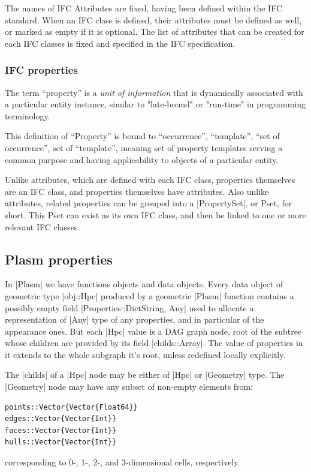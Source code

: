 \begin{coding}
The names of IFC Attributes are fixed, having been defined within the IFC standard. When an IFC class is defined, their attributes must be defined as well, or marked as empty if it is optional. The list of attributes that can be created for each IFC classes is fixed and specified in the IFC specification. 


\subsubsection*{IFC properties}\label{sect:4-4-2-2}

\begin{definition}
The term “property” is a \emph{unit of information} that is dynamically associated with a particular entity instance, similar to "late-bound" or "run-time" in programming terminology. 
\end{definition}

This definition of “Property” is bound to “occurrence”, “template”, “set of occurrence”, set of “template”, meaning set of property templates serving a common purpose and having applicability to objects of a particular entity.

Unlike attributes, which are defined with each IFC class, properties themselves are an IFC class, and properties themselves have attributes. Also unlike attributes, related properties can be grouped into a |PropertySet|, or Pset, for short. This Pset can exist as its own IFC class, and then be linked to one or more relevant IFC classes. 


\subsection*{Plasm properties}\label{sect:4-4-3}

In |Plasm| we have functions objects and data objects. Every data object of geometric type |obj::Hpc| produced by a geometric |Plasm| function contains a possibly empty field |Properties::Dict{String, Any}| used to allocate a representation of |Any| type of any properties, and in particular of the appearance ones. But each |Hpc| value is a DAG graph node, root of the subtree whose children are provided by its field |childs::Array|. The value of properties in it extends to the whole subgraph it’s root, unless redefined locally explicitly.

The |childs| of a |Hpc| node may be either of |Hpc| or |Geometry| type. The |Geometry| node may have any subset of non-empty elements from:
\begin{lstlisting}[language=JuliaLocal, style=julia, mathescape=true]
points::Vector{Vector{Float64}}
edges::Vector{Vector{Int}}
faces::Vector{Vector{Int}}
hulls::Vector{Vector{Int}}
\end{lstlisting}
corresponding to 0-, 1-, 2-, and 3-dimensional cells, respectively. 


\end{coding}
